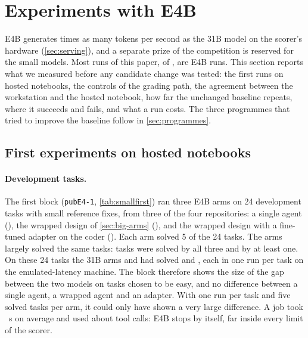 \section{Experiments with E4B}\label{sec:small}

E4B generates \ServeRatioSmallBig{} times as many tokens per second as the 31B model on the scorer's hardware
(\cref{sec:serving}), and a separate prize of the competition is reserved for the small models. Most runs of this
paper, \RunsEFour{} of \RunsTotal{}, are E4B runs. This section reports what we measured before any candidate change was tested: the first
runs on hosted notebooks, the controls of the grading path, the agreement between the workstation and the hosted
notebook, how far the unchanged baseline repeats, where it succeeds and fails, and what a run costs. The three
programmes that tried to improve the baseline follow in \cref{sec:programmes}.

\subsection{First experiments on hosted notebooks}\label{sec:small-first}



\paragraph{Development tasks.}
The first block (\texttt{pubE4-1}, \cref{tab:smallfirst}) ran three E4B arms on 24 development tasks with small
reference fixes, from three of the four repositories: a single agent (), the wrapped design of
\cref{sec:big-arms} (), and the wrapped design with a fine-tuned adapter on the coder ().
Each arm solved 5 of the 24 tasks. The arms largely solved the same tasks: \SmallPubAllThree{} tasks were solved by all
three and \SmallPubUnion{} by at least one. On these 24 tasks the 31B arms  and  had solved
\SmallPubBigBF{} and \SmallPubBigSH{}, each in one run per task on the emulated-latency machine. The block therefore shows the size of the gap
between the two models on tasks chosen to be easy, and no difference between a single agent, a wrapped agent and an
adapter. With one run per task and five solved tasks per arm, it could only have shown a very large difference. A job
took \SmallPubWall{}~s on average and used about \SmallPubTools{} tool calls: E4B stops by itself, far inside every
limit of the scorer.

